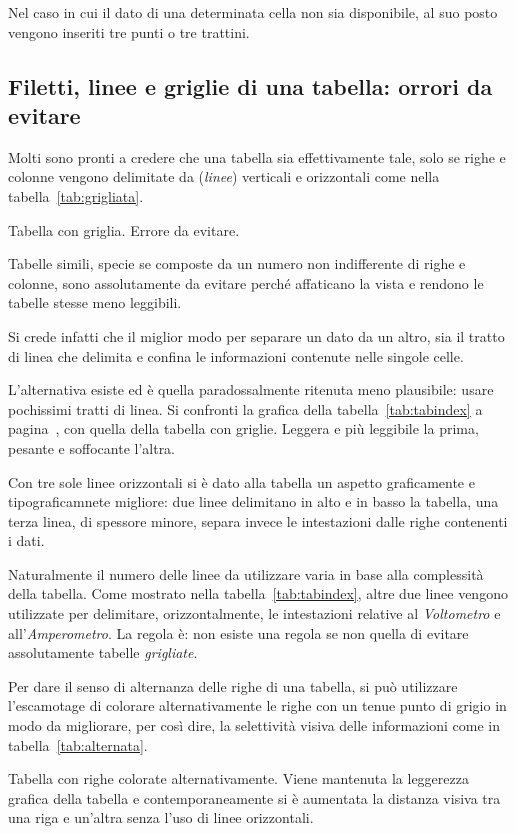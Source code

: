 Nel caso in cui il dato di una determinata cella non sia disponibile, al suo posto vengono inseriti tre punti o tre trattini.


					\subsection{Filetti, linee e griglie di una tabella: orrori da evitare}

Molti sono pronti a credere che una tabella sia effettivamente tale, solo se righe e colonne vengono delimitate da  (\textit{linee}) verticali e orizzontali come nella tabella~\ref{tab:grigliata}.
\begin{table}[htp]
 \centering\small
 \caption{Tabella con griglia. Errore da evitare.}
 \tabgrigliata
 \label{tab:grigliata}
\end{table}

Tabelle simili, specie se composte da un numero non indifferente di righe e colonne, sono assolutamente da evitare perché affaticano la vista e rendono le tabelle stesse meno leggibili.

Si crede infatti che il miglior modo per separare un dato da un altro, sia il tratto di linea che delimita e confina le informazioni contenute nelle singole celle.

L'alternativa esiste ed è quella paradossalmente ritenuta meno plausibile: usare pochissimi tratti di linea. Si confronti la grafica della tabella~\ref{tab:tabindex} a pagina~\pageref{tab:tabindex}, con quella della tabella con griglie. Leggera e più leggibile la prima, pesante e soffocante l'altra.

Con tre sole linee orizzontali si è dato alla tabella un aspetto graficamente e tipograficamnete migliore: due linee delimitano in alto e in basso la tabella, una terza linea, di spessore minore, separa invece le intestazioni dalle righe contenenti i dati.

Naturalmente il numero delle linee da utilizzare varia in base alla complessità della tabella. Come mostrato nella tabella~\ref{tab:tabindex}, altre due linee vengono utilizzate per delimitare, orizzontalmente, le intestazioni relative al \textit{Voltometro} e all'\textit{Amperometro}. La regola è: non esiste una regola se non quella di evitare assolutamente tabelle \textit{grigliate}.

Per dare il senso di alternanza delle righe di una tabella, si può utilizzare l'escamotage di colorare alternativamente le righe con un tenue punto di grigio in modo da migliorare, per così dire, la selettività visiva delle informazioni come in tabella~\ref{tab:alternata}.
\begin{table}[htp]
 \centering\small
 \caption[Tabella con righe colorate alternativamente.]{Tabella con righe colorate alternativamente. Viene mantenuta la leggerezza grafica della tabella e contemporaneamente si è aumentata la distanza visiva tra una riga e un'altra senza l'uso di linee orizzontali.}
 \tabalternata
 \label{tab:alternata}
\end{table}

